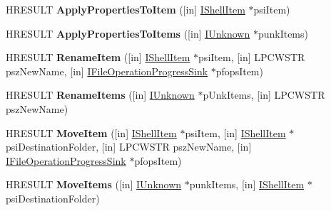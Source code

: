 \begin{DoxyCompactItemize}
\mbox{\label{interface_i_file_operation_ab868647b06037b8daf1946f55d9d7284}} 
H\+R\+E\+S\+U\+LT {\bfseries Apply\+Properties\+To\+Item} (\mbox{[}in\mbox{]} \hyperlink{interface_i_shell_item}{I\+Shell\+Item} $\ast$psi\+Item)
\item 
\mbox{\label{interface_i_file_operation_a1e77d60caa2f8afabb3cb1ef5f7d8ef6}} 
H\+R\+E\+S\+U\+LT {\bfseries Apply\+Properties\+To\+Items} (\mbox{[}in\mbox{]} \hyperlink{interface_i_unknown}{I\+Unknown} $\ast$punk\+Items)
\item 
\mbox{\label{interface_i_file_operation_a66f23ff6ea91a4a3f57ffdc703bff7b4}} 
H\+R\+E\+S\+U\+LT {\bfseries Rename\+Item} (\mbox{[}in\mbox{]} \hyperlink{interface_i_shell_item}{I\+Shell\+Item} $\ast$psi\+Item, \mbox{[}in\mbox{]} L\+P\+C\+W\+S\+TR psz\+New\+Name, \mbox{[}in\mbox{]} \hyperlink{interface_i_file_operation_progress_sink}{I\+File\+Operation\+Progress\+Sink} $\ast$pfops\+Item)
\item 
\mbox{\label{interface_i_file_operation_a419f46c9a05ad7969cc669135566f3bb}} 
H\+R\+E\+S\+U\+LT {\bfseries Rename\+Items} (\mbox{[}in\mbox{]} \hyperlink{interface_i_unknown}{I\+Unknown} $\ast$p\+Unk\+Items, \mbox{[}in\mbox{]} L\+P\+C\+W\+S\+TR psz\+New\+Name)
\item 
\mbox{\label{interface_i_file_operation_a49127d0bf4a198b9c982f0a5537b8100}} 
H\+R\+E\+S\+U\+LT {\bfseries Move\+Item} (\mbox{[}in\mbox{]} \hyperlink{interface_i_shell_item}{I\+Shell\+Item} $\ast$psi\+Item, \mbox{[}in\mbox{]} \hyperlink{interface_i_shell_item}{I\+Shell\+Item} $\ast$psi\+Destination\+Folder, \mbox{[}in\mbox{]} L\+P\+C\+W\+S\+TR psz\+New\+Name, \mbox{[}in\mbox{]} \hyperlink{interface_i_file_operation_progress_sink}{I\+File\+Operation\+Progress\+Sink} $\ast$pfops\+Item)
\item 
\mbox{\label{interface_i_file_operation_aa4f8dc48670992631704dca6e68ea77f}} 
H\+R\+E\+S\+U\+LT {\bfseries Move\+Items} (\mbox{[}in\mbox{]} \hyperlink{interface_i_unknown}{I\+Unknown} $\ast$punk\+Items, \mbox{[}in\mbox{]} \hyperlink{interface_i_shell_item}{I\+Shell\+Item} $\ast$psi\+Destination\+Folder)
\item 

\end{DoxyCompactItemize}
